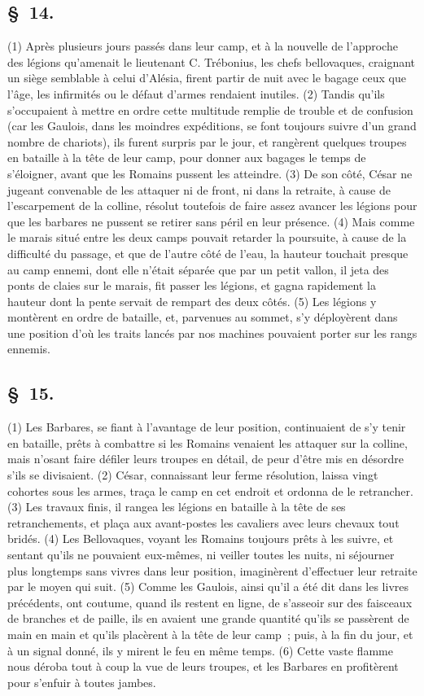 \documentclass[french,twoside]{book} %
\begin{document}
\subsection[{§ 14.}]{ \textsc{§ 14.} }
\noindent (1) Après plusieurs jours passés dans leur camp, et à la nouvelle de l’approche des légions qu’amenait le lieutenant C. Trébonius, les chefs bellovaques, craignant un siège semblable à celui d’Alésia, firent partir de nuit avec le bagage ceux que l’âge, les infirmités ou le défaut d’armes rendaient inutiles. (2) Tandis qu’ils s’occupaient à mettre en ordre cette multitude remplie de trouble et de confusion (car les Gaulois, dans les moindres expéditions, se font toujours suivre d’un grand nombre de chariots), ils furent surpris par le jour, et rangèrent quelques troupes en bataille à la tête de leur camp, pour donner aux bagages le temps de s’éloigner, avant que les Romains pussent les atteindre. (3) De son côté, César ne jugeant convenable de les attaquer ni de front, ni dans la retraite, à cause de l’escarpement de la colline, résolut toutefois de faire assez avancer les légions pour que les barbares ne pussent se retirer sans péril en leur présence. (4) Mais comme le marais situé entre les deux camps pouvait retarder la poursuite, à cause de la difficulté du passage, et que de l’autre côté de l’eau, la hauteur touchait presque au camp ennemi, dont elle n’était séparée que par un petit vallon, il jeta des ponts de claies sur le marais, fit passer les légions, et gagna rapidement la hauteur dont la pente servait de rempart des deux côtés. (5) Les légions y montèrent en ordre de bataille, et, parvenues au sommet, s’y déployèrent dans une position d’où les traits lancés par nos machines pouvaient porter sur les rangs ennemis.
\subsection[{§ 15.}]{ \textsc{§ 15.} }
\noindent (1) Les Barbares, se fiant à l’avantage de leur position, continuaient de s’y tenir en bataille, prêts à combattre si les Romains venaient les attaquer sur la colline, mais n’osant faire défiler leurs troupes en détail, de peur d’être mis en désordre s’ils se divisaient. (2) César, connaissant leur ferme résolution, laissa vingt cohortes sous les armes, traça le camp en cet endroit et ordonna de le retrancher. (3) Les travaux finis, il rangea les légions en bataille à la tête de ses retranchements, et plaça aux avant-postes les cavaliers avec leurs chevaux tout bridés. (4) Les Bellovaques, voyant les Romains toujours prêts à les suivre, et sentant qu’ils ne pouvaient eux-mêmes, ni veiller toutes les nuits, ni séjourner plus longtemps sans vivres dans leur position, imaginèrent d’effectuer leur retraite par le moyen qui suit. (5) Comme les Gaulois, ainsi qu’il a été dit dans les livres précédents, ont coutume, quand ils restent en ligne, de s’asseoir sur des faisceaux de branches et de paille, ils en avaient une grande quantité qu’ils se passèrent de main en main et qu’ils placèrent à la tête de leur camp ; puis, à la fin du jour, et à un signal donné, ils y mirent le feu en même temps. (6) Cette vaste flamme nous déroba tout à coup la vue de leurs troupes, et les Barbares en profitèrent pour s’enfuir à toutes jambes.
\end{document}
